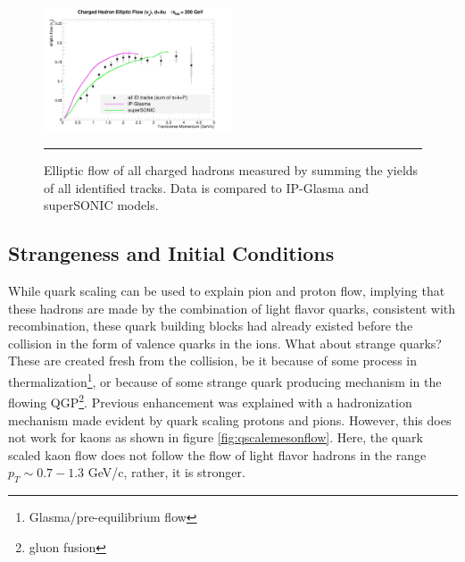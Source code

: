 \begin{figure}[hbtp]
\centering    
    \includegraphics[width=0.5\textwidth]{results/v2hydro.jpg}
    \rule{35em}{0.5pt}
    \caption[Elliptic flow of all charged hadrons compared to hydrodynamic models.]{Elliptic flow of all charged hadrons measured by summing the yields of all identified tracks. Data is compared to IP-Glasma and superSONIC models.}
    \label{fig:allhadronhydro}
\end{figure}

\subsection{Strangeness and Initial Conditions}
While quark scaling can be used to explain pion and proton flow, implying that these hadrons are made by the combination of light flavor quarks, consistent with recombination, these quark building blocks had already existed before the collision in the form of valence quarks in the ions. What about strange quarks? These are created fresh from the collision, be it because of some process in thermalization\footnote{Glasma/pre-equilibrium flow}, or because of some strange quark producing mechanism in the flowing QGP\footnote{gluon fusion}. Previous enhancement was explained with a hadronization mechanism made evident by quark scaling protons and pions. However, this does not work for kaons as shown in figure \ref{fig:qscalemesonflow}. Here, the quark scaled kaon flow does not follow the flow of light flavor hadrons in the range $p_T \sim 0.7-1.3$ GeV/c, rather, it is stronger.

